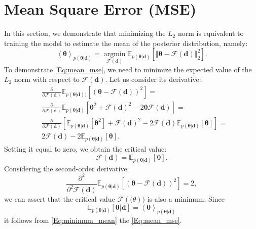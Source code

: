 \documentclass{aa}
\begin{document}
 

\begin{appendix}

\end{appendix}
\section{Mean Square Error (MSE)}
In this section, we demonstrate that minimizing the $L_2$ norm is equivalent to training the model to estimate the mean of the posterior distribution, namely:
\begin{equation}\label{Eq:mean_mse}
\left \langle \bm {\theta} \right \rangle_{p(\bm {\theta}|\bm{d})}=\operatorname*{argmin}_{\mathcal{F}(\bm{d})}\mathbb{E}_{p(\bm {\theta}|\bm {d})}[\left\Vert \bm {\theta}-\mathcal{F}(\bm{d})
 \right \Vert_{2}^{2}].
\end{equation}
To demonstrate \autoref{Eq:mean_mse}, we need to minimize the expected value of the $L_2$ norm with respect to $\mathcal{F}(\bm{d})$. Let us consider its derivative:
\begin{align}\label{Eq:moment_1}
   & \frac{\partial}{\partial \mathcal{F}(\bm{d}) }  \mathbb{E}_{p(\bm {\theta}|\bm{d}))}[(\bm {\theta}-\mathcal{F}(\bm{d}))^2] =  \\
    &
    \frac{\partial}{\partial \mathcal{F}(\bm{d}) }  \mathbb{E}_{p(\bm {\theta}|\bm {d})}[\bm {\theta}^2+\mathcal{F}(\bm{d})^2-2\bm {\theta}\mathcal{F}(\bm{d})] = \nonumber \\
    &
    \frac{\partial}{\partial \mathcal{F}(\bm{d}) }  [
    \mathbb{E}_{p(\bm {\theta}|\bm {d})}[\bm {\theta}^2]+\mathcal{F}(\bm{d})^2-2\mathcal{F}(\bm{d})\mathbb{E}_{p(\bm {\theta}|\bm {d})}[\bm {\theta}]]= \nonumber \\
    &2\mathcal{F}(\bm{d})-2 \mathbb{E}_{p(\bm {\theta}|\bm {d})}[\bm {\theta}]. \nonumber
\end{align}
Setting it equal to zero, we obtain the critical value:
\begin{equation}
    \mathcal{F}(\bm{d})= \mathbb{E}_{p(\bm {\theta}|\bm {d})}[\bm {\theta}]. 
\end{equation}
Considering the second-order derivative:
\begin{equation}\label{Eq:minimum_mean}
   \frac{\partial^2}{\partial^2 \mathcal{F}(\bm{d})}  \mathbb{E}_{p(\bm {\theta}|\bm {d})}[(\bm {\theta}-\mathcal{F}(\bm{d}))^2]=2, 
\end{equation}
we can assert that the critical value $\mathcal{F(\bm(\theta))}$ is also a minimum. 
Since 
\begin{equation}
    \mathbb{E}_{p(\bm {\theta}|\bm {d})}[\bm {\theta}|\bm{d}]= \left \langle \bm {\theta} \right \rangle_{p(\bm {\theta}|\bm{d})}
\end{equation}
it follows from \autoref{Eq:minimum_mean} the \autoref{Eq:mean_mse}.
\end{document}
